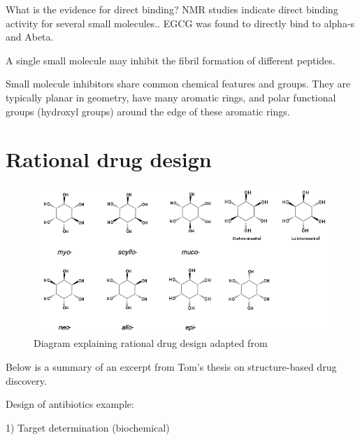 What is the evidence for direct binding? NMR studies indicate direct binding activity for several small molecules.\cite{XXX EGCG paper nature 2007}.  EGCG was found to directly bind to alpha-s and Abeta.

A single small molecule may inhibit the fibril formation of different peptides.

Small molecule inhibitors share common chemical features and groups.  They are typically planar in geometry, have many aromatic rings, and polar functional groups (hydroxyl groups) around the edge of these aromatic rings.\cite{Stempler:2011dy,Shoval:2007p3547,Porat:2006fn,Lemkul:2012da}

\section{Rational drug design}

\begin{figure}
	\centering
	\includegraphics[width=6in]{figures/introduction/inositol.png}
	\caption[Rational drug design]{Diagram explaining rational drug design adapted from\cite{Gohlke:2002in}}
	\label{fig:rational_drug_design}
\end{figure}

Below is a summary of an excerpt from Tom's thesis on structure-based drug discovery.

Design of antibiotics example: 

1) Target determination (biochemical)

